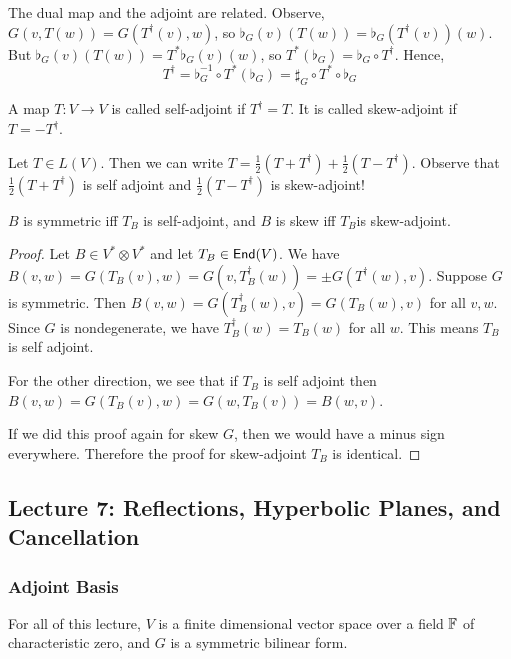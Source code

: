 \begin{remark*}
    The dual map and the adjoint are related. Observe, $G(v,T(w)) = G(T^\dagger (v),w)$, so $\flat_G(v)(T(w)) = \flat_G(T^\dagger(v))(w)$. But $\flat_G(v)(T(w)) = T^*\flat_G(v)(w)$, so $T^*(\flat_G) = \flat_G \circ T^\dagger$. Hence,
    \begin{equation}
        T^\dagger = \flat_G^{-1} \circ T^*(\flat_G) = \sharp_G\circ T^*\circ \flat_G
    \end{equation}
\end{remark*}

\begin{defn} A map $T : V \to V$ is called self-adjoint if $T^\dagger = T$. It is called skew-adjoint if $T=-T^\dagger$.
\end{defn}
\begin{remark*}
    Let $T \in L(V)$. Then we can write $T = \frac{1}{2}(T+T^\dagger)+\frac{1}{2}(T-T^\dagger)$. Observe that $\frac{1}{2}(T+T^\dagger)$ is self adjoint and $\frac{1}{2}(T-T^\dagger)$ is skew-adjoint!
\end{remark*}
\begin{lemma}
    $B$ is symmetric iff $T_B$ is self-adjoint, and $B$ is skew iff $T_B$is skew-adjoint.
\end{lemma}
\begin{proof}
    Let $B \in V^*\otimes V^*$ and let $T_B \in \operatorname{\textsf{End}}(V)$. We have $B(v,w) = G(T_B(v),w) = G(v,T_B^\dagger(w)) = \pm G(T^\dagger(w),v)$. Suppose $G$ is symmetric. Then $B(v,w) = G(T^\dagger_B(w),v) = G(T_B(w),v)$ for all $v,w$. Since $G$ is nondegenerate, we have $T^\dagger_B(w)=T_B(w)$ for all $w$. This means $T_B$ is self adjoint. 

    For the other direction, we see that if $T_B$ is self adjoint then $B(v,w) = G(T_B(v),w) = G(w,T_B(v)) = B(w,v)$. 

    If we did this proof again for skew $G$, then we would have a minus sign everywhere. Therefore the proof for skew-adjoint $T_B$ is identical.
\end{proof}

\subsection{Lecture 7: Reflections, Hyperbolic Planes, and Cancellation}

\subsubsection{Adjoint Basis}
For all of this lecture, $V$ is a finite dimensional vector space over a field $\operatorname{\mathbb{F}}$ of characteristic zero, and $G$ is a symmetric bilinear form.

